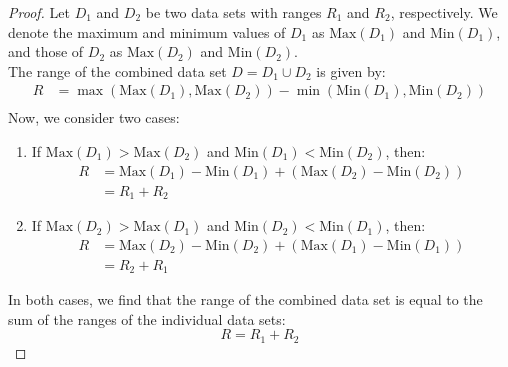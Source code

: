 \documentclass[openany]{book}
\begin{document}
\begin{proof}
    Let $D_1$ and $D_2$ be two data sets with ranges $R_1$ and $R_2$, respectively. We denote the maximum and minimum values of $D_1$ as $\text{Max}(D_1)$ and $\text{Min}(D_1)$, and those of $D_2$ as $\text{Max}(D_2)$ and $\text{Min}(D_2)$. \\
    The range of the combined data set $D = D_1 \cup D_2$ is given by:
    \begin{align*}
        R &= \max(\text{Max}(D_1), \text{Max}(D_2)) - \min(\text{Min}(D_1), \text{Min}(D_2)) \\
    \end{align*}
    Now, we consider two cases:
    \begin{enumerate}
        \item If $\text{Max}(D_1) > \text{Max}(D_2)$ and $\text{Min}(D_1) < \text{Min}(D_2)$, then:
        \begin{align*}
            R &= \text{Max}(D_1) - \text{Min}(D_1) + (\text{Max}(D_2) - \text{Min}(D_2)) \\
            &= R_1 + R_2
        \end{align*}
        \item If $\text{Max}(D_2) > \text{Max}(D_1)$ and $\text{Min}(D_2) < \text{Min}(D_1)$, then:
        \begin{align*}
            R &= \text{Max}(D_2) - \text{Min}(D_2) + (\text{Max}(D_1) - \text{Min}(D_1)) \\
            &= R_2 + R_1
        \end{align*}
    \end{enumerate}
    In both cases, we find that the range of the combined data set is equal to the sum of the ranges of the individual data sets:
    $$R = R_1 + R_2$$
\end{proof}
\end{document}
